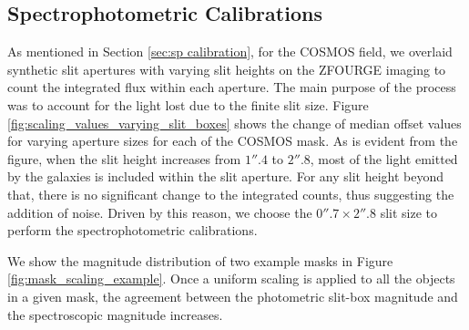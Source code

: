 \documentclass[iop]{emulateapj}
\begin{document}
\subsection{Spectrophotometric Calibrations}


As mentioned in Section \ref{sec:sp calibration}, for the COSMOS field, we overlaid synthetic slit apertures with varying slit heights on the ZFOURGE imaging to count the integrated flux within each aperture. The main purpose of the process was to account for the light lost due to the finite slit size. 
Figure \ref{fig:scaling_values_varying_slit_boxes} shows the change of median offset values for varying aperture sizes for each of the COSMOS mask.  As is evident from the figure, when the slit height increases from $1''.4$ to $2''.8$, most of the light emitted by the galaxies is included within the slit aperture. For any slit height beyond that, there is no significant change to the integrated counts, thus suggesting the addition of noise. Driven by this reason, we choose the $0''.7\times2''.8$ slit size to perform the spectrophotometric calibrations.  


We show the magnitude distribution of two example masks in Figure \ref{fig:mask_scaling_example}. Once a uniform scaling is applied to all the objects in a given mask, the agreement between the photometric slit-box magnitude and the spectroscopic magnitude increases. 
\end{document}
